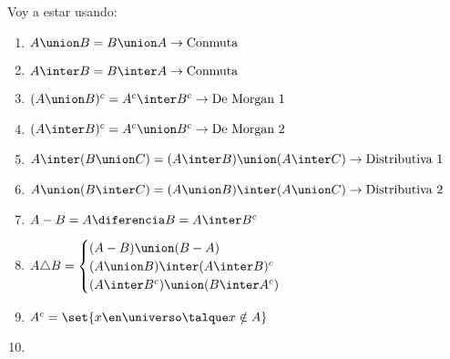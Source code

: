 Voy a estar usando:
\begin{enumerate}[label=(\alph*)]
  \item $A \union B = B \union A \to \text{Conmuta}$
  \item $A \inter B = B \inter A \to \text{Conmuta}$
  \item $(A \union B)^c = A^c \inter B^c \to \text{De Morgan 1}$
  \item $(A \inter B)^c = A^c \union B^c \to \text{De Morgan 2}$
  \item $A \inter(B \union C) = (A \inter B) \union (A \inter C) \to \text{Distributiva 1}$
  \item $A \union(B \inter C) = (A \union B) \inter (A \union C) \to \text{Distributiva 2}$
  \item $A - B = A \diferencia B = A \inter B^c$
  \item $A \triangle B =
          \begin{cases}
            (A - B) \union (B - A)             \\
            (A \union B) \inter (A \inter B)^c \\
            (A \inter B^c) \union (B \inter A^c)
          \end{cases}
        $
  \item $A^c = \set{x \en \universo \talque x \notin A}$
  \item
        \def\subconjuntoYequivalente{
          \begin{array}{|c|}
            A \subseteq B \\
            \hline
            A^c \union B
          \end{array}
        }


\end{enumerate}
